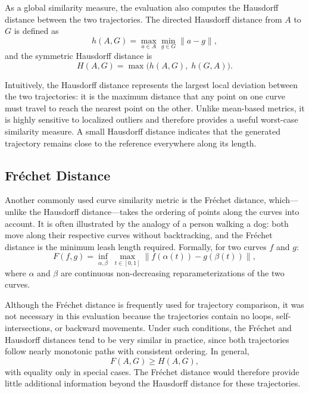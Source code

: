 As a global similarity measure, the evaluation also computes the Hausdorff distance between the two trajectories. The directed Hausdorff distance from $A$ to $G$ is defined as
\begin{equation}
  h(A, G) = \max_{a \in A} \min_{g \in G} \|a - g\|,
  \label{eq:directed_hausdorff}
\end{equation}
and the symmetric Hausdorff distance is
\begin{equation}
  H(A, G) = \max\bigl(h(A, G),\; h(G, A)\bigr).
  \label{eq:hausdorff}
\end{equation}

Intuitively, the Hausdorff distance represents the largest local deviation between the two trajectories: it is the maximum distance that any point on one curve must travel to reach the nearest point on the other. Unlike mean-based metrics, it is highly sensitive to localized outliers and therefore provides a useful worst-case similarity measure. A small Hausdorff distance indicates that the generated trajectory remains close to the reference everywhere along its length.

\FloatBarrier
\subsection{Fréchet Distance}
\label{sec:eval_frechet}

Another commonly used curve similarity metric is the Fréchet distance, which---unlike the Hausdorff distance---takes the ordering of points along the curves into account. It is often illustrated by the analogy of a person walking a dog: both move along their respective curves without backtracking, and the Fréchet distance is the minimum leash length required. Formally, for two curves $f$ and $g$:
\begin{equation}
  F(f, g) = \inf_{\alpha,\beta}\; \max_{t \in [0,1]} \|f(\alpha(t)) - g(\beta(t))\|,
  \label{eq:frechet}
\end{equation}
where $\alpha$ and $\beta$ are continuous non-decreasing reparameterizations of the two curves.

Although the Fréchet distance is frequently used for trajectory comparison, it was not necessary in this evaluation because the trajectories contain no loops, self-intersections, or backward movements. Under such conditions, the Fréchet and Hausdorff distances tend to be very similar in practice, since both trajectories follow nearly monotonic paths with consistent ordering. In general,
\begin{equation}
  F(A, G) \geq H(A, G),
  \label{eq:frechet_hausdorff}
\end{equation}
with equality only in special cases. The Fréchet distance would therefore provide little additional information beyond the Hausdorff distance for these trajectories.

